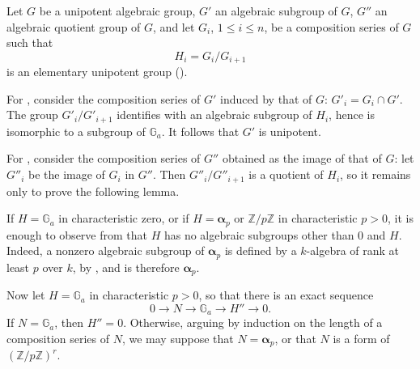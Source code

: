 Let \(G\) be a unipotent algebraic group, \(G'\) an algebraic subgroup of
\(G\), \(G''\) an algebraic quotient group of \(G\), and let
\(G_i\), \(1\leq i\leq n\), be a composition series of \(G\) such that
\[
  H_i=G_i/G_{i+1}
\]
is an elementary unipotent group ().

For , consider the composition series of \(G'\) induced by that of \(G\):
\(G'_i=G_i\cap G'\).  The group \(G'_i/G'_{i+1}\) identifies with an
algebraic subgroup of \(H_i\), hence is isomorphic to a subgroup of
\(\mathbb G_a\).  It follows that \(G'\) is unipotent.

For , consider the composition series of \(G''\) obtained as the image
of that of \(G\): let \(G''_i\) be the image of \(G_i\) in \(G''\).  Then
\(G''_i/G''_{i+1}\) is a quotient of \(H_i\), so it remains only to prove the
following lemma.


If \(H=\mathbb G_a\) in characteristic zero, or if
\(H=\boldsymbol\alpha_p\) or \(\mathbb Z/p\mathbb Z\) in characteristic
\(p>0\), it is enough to observe from  that \(H\) has no
algebraic subgroups other than \(0\) and \(H\).  Indeed, a nonzero algebraic
subgroup of \(\boldsymbol\alpha_p\) is defined by a \(k\)-algebra of rank at
least \(p\) over \(k\), by , and is therefore
\(\boldsymbol\alpha_p\).

Now let \(H=\mathbb G_a\) in characteristic \(p>0\), so that there is an exact
sequence
\[
  0\longrightarrow N\longrightarrow\mathbb G_a
    \longrightarrow H''\longrightarrow0.
\]
If \(N=\mathbb G_a\), then \(H''=0\).  Otherwise, arguing by induction on the
length of a composition series of \(N\), we may suppose that
\(N=\boldsymbol\alpha_p\), or that \(N\) is a form of
\((\mathbb Z/p\mathbb Z)^r\).

